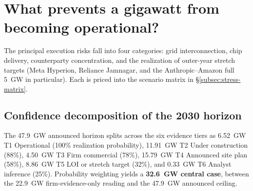 \documentclass[11pt,a4paper]{article}
\begin{document}
\section{What prevents a gigawatt from becoming operational?}
\label{sec:execution-risk}

The principal execution risks fall into four categories: grid interconnection, chip delivery, counterparty concentration, and the realization of outer-year stretch targets (Meta Hyperion, Reliance Jamnagar, and the Anthropic--Amazon full 5~GW in particular). Each is priced into the scenario matrix in \S\ref{subsec:stress-matrix}.

\subsection{Confidence decomposition of the 2030 horizon}

The 47.9~GW announced horizon splits across the six evidence tiers as 6.52~GW T1 Operational (100\% realization probability), 11.91~GW T2 Under construction (88\%), 4.50~GW T3 Firm commercial (78\%), 15.79~GW T4 Announced site plan (58\%), 8.86~GW T5 LOI or stretch target (32\%), and 0.33~GW T6 Analyst inference (25\%). Probability weighting yields a \textbf{32.6~GW central case}, between the 22.9~GW firm-evidence-only reading and the 47.9~GW announced ceiling.
\end{document}
